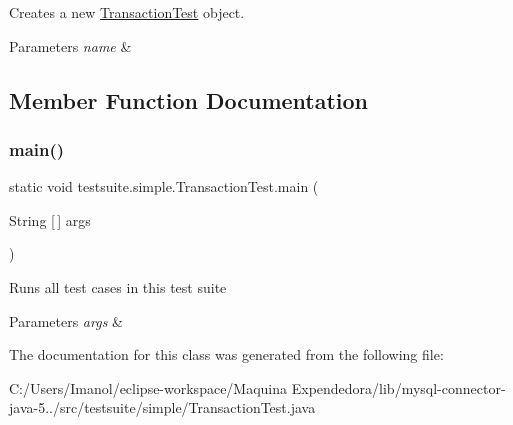 Creates a new \mbox{\hyperlink{classtestsuite_1_1simple_1_1_transaction_test}{Transaction\+Test}} object.


\begin{DoxyParams}{Parameters}
{\em name} & \\
\hline
\end{DoxyParams}


\subsection{Member Function Documentation}
\mbox{\label{classtestsuite_1_1simple_1_1_transaction_test_a64f59050254d996e0009d60f8cfed9ae}} 
\subsubsection{\texorpdfstring{main()}{main()}}
{\footnotesize\ttfamily static void testsuite.\+simple.\+Transaction\+Test.\+main (\begin{DoxyParamCaption}\item[{String \mbox{[}$\,$\mbox{]}}]{args }\end{DoxyParamCaption})\hspace{0.3cm}{\ttfamily [static]}}

Runs all test cases in this test suite


\begin{DoxyParams}{Parameters}
{\em args} & \\
\hline
\end{DoxyParams}


The documentation for this class was generated from the following file\+:\begin{DoxyCompactItemize}
\item 
C\+:/\+Users/\+Imanol/eclipse-\/workspace/\+Maquina Expendedora/lib/mysql-\/connector-\/java-\/5../src/testsuite/simple/Transaction\+Test.\+java\end{DoxyCompactItemize}
